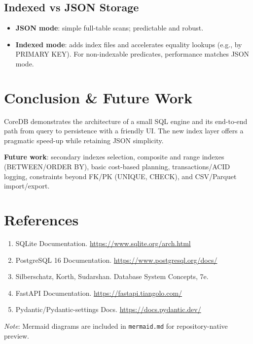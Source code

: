 \documentclass[12pt,a4paper]{article}
\begin{document}
\subsection{Indexed vs JSON Storage}
\begin{itemize}[leftmargin=*,nosep]
  \item \textbf{JSON mode}: simple full-table scans; predictable and robust.
  \item \textbf{Indexed mode}: adds index files and accelerates equality lookups (e.g., by PRIMARY KEY). For non-indexable predicates, performance matches JSON mode.
\end{itemize}

\section{Conclusion \& Future Work}
CoreDB demonstrates the architecture of a small SQL engine and its end-to-end path from query to persistence with a friendly UI. The new index layer offers a pragmatic speed-up while retaining JSON simplicity.

\textbf{Future work}: secondary indexes selection, composite and range indexes (BETWEEN/ORDER BY), basic cost-based planning, transactions/ACID logging, constraints beyond FK/PK (UNIQUE, CHECK), and CSV/Parquet import/export.

\section{References}
\begin{enumerate}[leftmargin=*,nosep]
  \item SQLite Documentation. \url{https://www.sqlite.org/arch.html}
  \item PostgreSQL 16 Documentation. \url{https://www.postgresql.org/docs/}
  \item Silberschatz, Korth, Sudarshan. Database System Concepts, 7e.
  \item FastAPI Documentation. \url{https://fastapi.tiangolo.com/}
  \item Pydantic/Pydantic-settings Docs. \url{https://docs.pydantic.dev/}
\end{enumerate}

\vspace{1em}
\noindent \textit{Note}: Mermaid diagrams are included in \texttt{mermaid.md} for repository-native preview.
\end{document}
